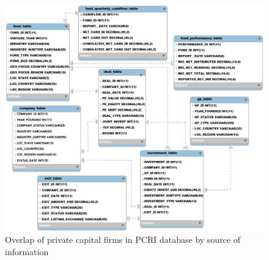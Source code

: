 
\begin{figure}[tb]
    \centering
\includegraphics[width=\widthpcrib]{./assets/pcri/pcrifigure2.png}
\caption{Overlap of private capital firms in PCRI database by source of information\label{fig:pcrifigure2}}
\end{figure}
